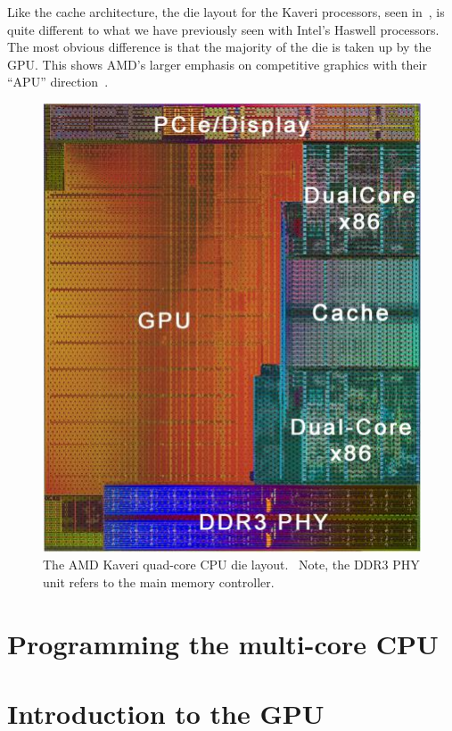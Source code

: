 \documentclass[a4paper,11pt]{article}
\begin{document}
Like the cache architecture, the die layout for the Kaveri processors, seen in~, is quite different to what we have previously seen with Intel's Haswell processors. The most obvious difference is that the majority of the die is taken up by the GPU. This shows AMD's larger emphasis on competitive graphics with their ``APU'' direction~\cite{web:WikiAPU}.

\begin{figure}[h]
  \centering
  \includegraphics[scale=0.5]{img/kaveri_die}
  \caption{The AMD Kaveri quad-core CPU die layout.~\cite{web:Guru3dKaveri} Note, the DDR3 PHY unit refers to the main memory controller.}
\label{fig:kaveri-layout}
\end{figure}






\section{Programming the multi-core CPU} %
\label{sec:programming_the_multi_core_cpu}



\section{Introduction to the GPU} %
\label{sec:introduction_to_the_gpu}
\end{document}
